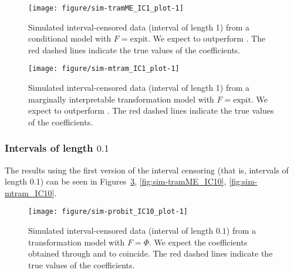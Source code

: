 \documentclass[article,nojss,shortnames]{jss}\usepackage[]{graphicx}\usepackage[]{xcolor}
\newcommand{\expit}{\text{expit}}
\newcommand{\pN}{\Phi}
\begin{document}
\begin{figure}
\begin{Schunk}


{\centering \texttt{[image: figure/sim-tramME\_IC1\_plot-1]} 

}

\end{Schunk}
\caption{Simulated interval-censored data (interval of length 1)
from a conditional model with $F = \expit$.
We expect  to outperform .
The red dashed lines indicate the true values of the coefficients.
\label{fig:sim-tramME_IC1}}
\end{figure}



\begin{figure}
\begin{Schunk}


{\centering \texttt{[image: figure/sim-mtram\_IC1\_plot-1]} 

}

\end{Schunk}
\caption{Simulated interval-censored data (interval of length 1)
from a marginally interpretable transformation
model with $F = \expit$.
We expect  to outperform .
The red dashed lines indicate the true values of the coefficients.
\label{fig:sim-mtram_IC1}}
\end{figure}


\subsubsection{Intervals of length $0.1$}

The results using the first version of the interval censoring (that is, intervals
of length 0.1) can be seen in Figures~\ref{fig:sim-probit_IC10}, 
\ref{fig:sim-tramME_IC10}, \ref{fig:sim-mtram_IC10}.




\begin{figure}
\begin{Schunk}


{\centering \texttt{[image: figure/sim-probit\_IC10\_plot-1]} 

}

\end{Schunk}
\caption{Simulated interval-censored data (interval of length $0.1$)
from a transformation model with $F = \pN$. 
We expect the coefficients obtained through  and  to
coincide.
The red dashed lines indicate the true values of the coefficients. 
\label{fig:sim-probit_IC10}}
\end{figure}
\end{document}
